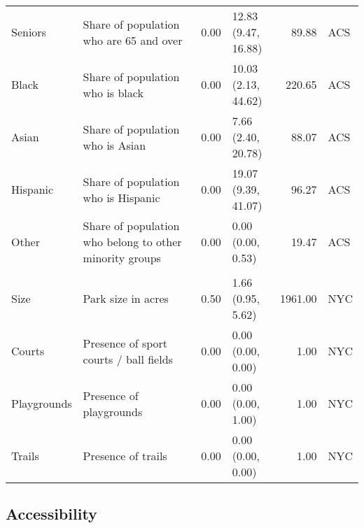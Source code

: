 \documentclass[shortAfour,sageh.bst]{sagej}
\begin{document}
\begin{table*}
{\begin{tabular}[t]{l>{\raggedright\arraybackslash}p{2in}rlrl}
\hspace{1em}Seniors & Share of population who are 65 and over & 0.00 & \makecell{12.83\\ (9.47, 16.88)} & 89.88 & ACS\\
\hspace{1em}Black & Share of population who is black & 0.00 & \makecell{10.03\\ (2.13, 44.62)} & 220.65 & ACS\\
\hspace{1em}Asian & Share of population who is Asian & 0.00 & \makecell{7.66\\ (2.40, 20.78)} & 88.07 & ACS\\
\hspace{1em}Hispanic & Share of population who is Hispanic & 0.00 & \makecell{19.07\\ (9.39, 41.07)} & 96.27 & ACS\\
\hspace{1em}Other & Share of population who belong to other minority groups & 0.00 & \makecell{0.00\\ (0.00, 0.53)} & 19.47 & ACS\\
\addlinespace[0.3em]
\multicolumn{6}{l}{\textbf{Park Variables, N = 1277}}\\
\hspace{1em}Size & Park size in acres & 0.50 & \makecell{1.66\\ (0.95, 5.62)} & 1961.00 & NYC\\
\hspace{1em}Courts & Presence of sport courts / ball fields & 0.00 & \makecell{0.00\\ (0.00, 0.00)} & 1.00 & NYC\\
\hspace{1em}Playgrounds & Presence of playgrounds & 0.00 & \makecell{0.00\\ (0.00, 1.00)} & 1.00 & NYC\\
\hspace{1em}Trails & Presence of trails & 0.00 & \makecell{0.00\\ (0.00, 0.00)} & 1.00 & NYC\\
\bottomrule
\end{tabular}}
\end{table*}

\hypertarget{accessibility}{%
\subsection{Accessibility}\label{accessibility}}
\end{document}
